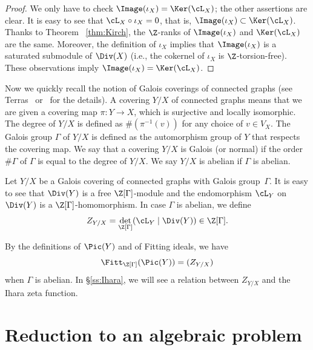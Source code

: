 \begin{proof}
We only have to check $\Image(\iota_X) = \Ker(\cL_X)$; the other assertions are clear.
It is easy to see that $\cL_X \circ \iota_X = 0$, that is, $\Image(\iota_X) \subset \Ker(\cL_X)$.
Thanks to Theorem ~\ref{thm:Kirch}, the $\Z$-ranks of $\Image(\iota_X)$ and $ \Ker(\cL_X)$ are the same.
Moreover, the definition of $\iota_X$ implies that $\Image(\iota_X)$ is a saturated submodule of $\Div(X)$ (i.e., the cokernel of $\iota_X$ is $\Z$-torsion-free).
These observations imply $\Image(\iota_X) = \Ker(\cL_X)$.
\end{proof}


Now we quickly recall the notion of Galois coverings of connected graphs (see Terras~\cite[Chapter 13]{Ter11} or~\cite[\S 2.1]{RV22} for the details).
A covering $Y/X$ of connected graphs means that we are given a covering map $\pi: Y \to X$, which is surjective and locally isomorphic.
The degree of $Y/X$ is defined as $\# (\pi^{-1}(v))$ for any choice of $v \in V_X$.
The Galois group $\Gamma$ of $Y/X$ is defined as the automorphism group of $Y$ that respects the covering map.
We say that a covering $Y/X$ is Galois (or normal) if the order $\# \Gamma$ of $\Gamma$ is equal to the degree of $Y/X$.
We say $Y/X$ is abelian if $\Gamma$ is abelian.


\begin{defi}\label{defn:Z2}
Let $Y/X$ be a Galois covering of connected graphs with Galois group~$\Gamma$.
It is easy to see that $\Div(Y)$ is a free $\Z[\Gamma]$-module and the endomorphism $\cL_Y$ on $\Div(Y)$ is a $\Z[\Gamma]$-homomorphism.
In case $\Gamma$ is abelian, we define
\begin{equation}\label{eq:Z_YX}
Z_{Y/X} = \det_{\Z[\Gamma]}(\cL_Y \mid \Div(Y)) \in \Z[\Gamma].
\end{equation}
\end{defi}

By the definitions of $\Pic(Y)$ and of Fitting ideals, we have
\begin{equation}\label{eq:Z_YX2}
\Fitt_{\Z[\Gamma]}(\Pic(Y)) = (Z_{Y/X})
\end{equation}
when $\Gamma$ is abelian.
In \S\ref{ss:Ihara}, we will see a relation between $Z_{Y/X}$ and the Ihara zeta function.

\section{Reduction to an algebraic problem}\label{sec:Fin_arith}

